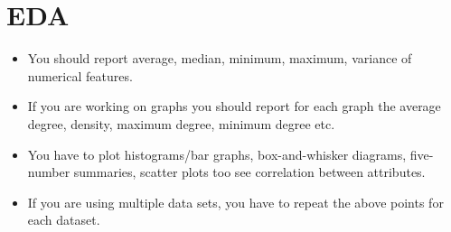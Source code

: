 \documentclass[11pt]{article}
\begin{document}
\section{EDA}
	\begin{itemize}
		\item You should report average, median, minimum, maximum, variance of numerical features.
		\item 	If you are working on graphs you should report for each graph the average degree, density, maximum degree, minimum degree etc.
		\item You have to plot histograms/bar graphs, box-and-whisker diagrams, five-number summaries, scatter plots too see correlation between attributes.
		\item If you are using multiple data sets, you have to repeat the above points for each dataset.
	\end{itemize}
  
\end{document}
